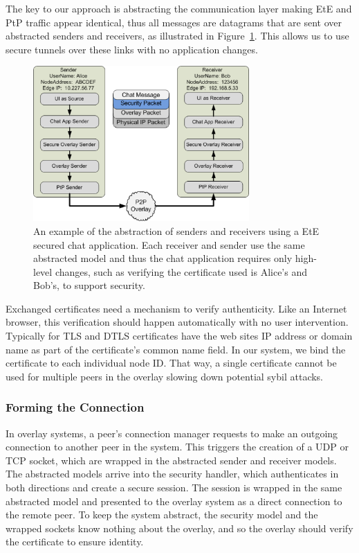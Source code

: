 \documentclass[conference]{IEEEtran}
\begin{document}
The key to our approach is abstracting the communication layer making EtE and
PtP traffic appear identical, thus all messages are datagrams that are sent
over abstracted senders and receivers, as illustrated in
Figure~\ref{fig:senders_receivers}.  This allows us to use secure tunnels over
these links with no application changes.

\begin{figure}[h]
\centering
\includegraphics[width=3.25in]{secure_sender_stack_generic.png.eps}
\caption{An example of the abstraction of senders and receivers using a EtE 
secured chat application.  Each receiver and sender use the same abstracted
model and thus the chat application requires only high-level changes, such
as verifying the certificate used is Alice's and Bob's, to support security.}
\label{fig:senders_receivers}
\end{figure}

Exchanged certificates need a mechanism to verify authenticity.  Like an
Internet browser, this verification should happen automatically with no user
intervention.  Typically for TLS and DTLS certificates have the web sites
IP address or domain name as part of the certificate's common name field.  In
our system, we bind the certificate to each individual node ID.  That way,
a single certificate cannot be used for multiple peers in the overlay slowing
down potential sybil attacks.

\subsubsection{Forming the Connection}
In overlay systems, a peer's connection manager requests to make an outgoing
connection to another peer in the system.  This triggers the creation of a
UDP or TCP socket, which are wrapped in the abstracted sender and receiver
models.  The abstracted models arrive into the security handler, which
authenticates in both directions and create a secure session.  The session is
wrapped in the same abstracted model and presented to the overlay system as a
direct connection to the remote peer.  To keep the system abstract, the security
model and the wrapped sockets know nothing about the overlay, and so the overlay
should verify the certificate to ensure identity.
\end{document}
